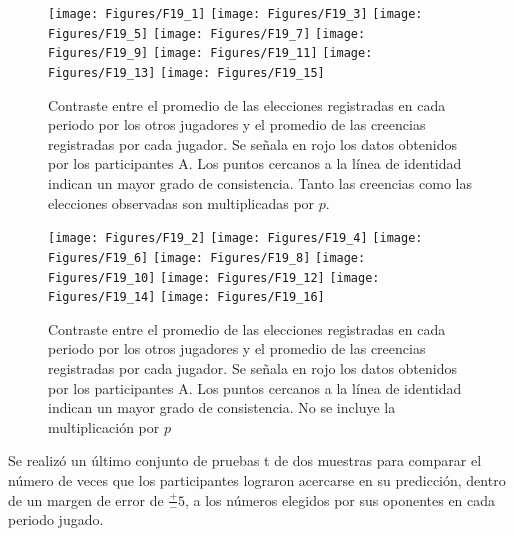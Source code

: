 \begin{figure}[hp]
\centering
\texttt{[image: Figures/F19\_1]} 
\texttt{[image: Figures/F19\_3]} 
\texttt{[image: Figures/F19\_5]} 
\texttt{[image: Figures/F19\_7]} 
\texttt{[image: Figures/F19\_9]} 
\texttt{[image: Figures/F19\_11]} 
\texttt{[image: Figures/F19\_13]} 
\texttt{[image: Figures/F19\_15]} 
\decoRule
\caption[Precisión en la predicción de los números a elegir por los otros participantes (se incluye la multiplicación por $p$ de las creencias y las elecciones observadas)]{Contraste entre el promedio de las elecciones registradas en cada periodo por los otros jugadores y el promedio de las creencias registradas por cada jugador. Se señala en rojo los datos obtenidos por los participantes A. Los puntos cercanos a la línea de identidad indican un mayor grado de consistencia. Tanto las creencias como las elecciones observadas son multiplicadas por $p$.}
\label{fig:Precision_p}
\end{figure}  


\begin{figure}[hp]
\centering
\texttt{[image: Figures/F19\_2]} 
\texttt{[image: Figures/F19\_4]} 
\texttt{[image: Figures/F19\_6]} 
\texttt{[image: Figures/F19\_8]} 
\texttt{[image: Figures/F19\_10]} 
\texttt{[image: Figures/F19\_12]} 
\texttt{[image: Figures/F19\_14]} 
\texttt{[image: Figures/F19\_16]} 
\decoRule
\caption[Precisión en la predicción de los números a elegir por los otros participantes (se omite la multiplicación por $p$)]{Contraste entre el promedio de las elecciones registradas en cada periodo por los otros jugadores y el promedio de las creencias registradas por cada jugador. Se señala en rojo los datos obtenidos por los participantes A. Los puntos cercanos a la línea de identidad indican un mayor grado de consistencia. No se incluye la multiplicación por $p$}
\label{fig:Precision_nop}
\end{figure}  

Se realizó un último conjunto de pruebas t de dos muestras para comparar el número de veces que los participantes lograron acercarse en su predicción, dentro de un margen de error de $\frac{+}{-}5$, a los números elegidos por sus oponentes en cada periodo jugado.\\

